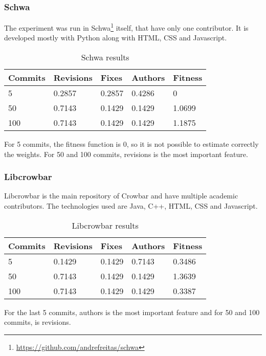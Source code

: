 \subsubsection{Schwa}
The experiment was run in Schwa\footnote{\url{https://github.com/andrefreitas/schwa}} itself, that have only one contributor. It is developed mostly with Python along with HTML, CSS and Javascript.

\begin{table}[H]
    \centering
    \caption{Schwa results}
    \label{table:learning_schwa}
    \begin{tabular}{|l|l|l|l|l|}
        \hline
        Commits & Revisions & Fixes & Authors & Fitness \\ \hline
        5 & 0.2857 & 0.2857 & 0.4286 & 0 \\ \hline
        50 & 0.7143 & 0.1429 & 0.1429 & 1.0699 \\ \hline
        100 & 0.7143 & 0.1429 & 0.1429 & 1.1875 \\ \hline
    \end{tabular}
\end{table}

For 5 commits, the fitness function is 0, so it is not possible to estimate correctly the weights. For 50 and 100 commits, revisions is the most important feature.

\subsubsection{Libcrowbar}
Libcrowbar is the main repository of Crowbar and have multiple academic contributors. The technologies used are Java, C++, HTML, CSS and Javascript.

\begin{table}[H]
    \centering
    \caption{Libcrowbar results}
    \label{table:learning_libcrowbar}
    \begin{tabular}{|l|l|l|l|l|}
        \hline
        Commits & Revisions & Fixes & Authors & Fitness \\ \hline
        5 & 0.1429 & 0.1429 & 0.7143 & 0.3486 \\ \hline
        50 & 0.7143 & 0.1429 & 0.1429 & 1.3639 \\ \hline
        100 & 0.7143 & 0.1429 & 0.1429 & 0.3387 \\ \hline
    \end{tabular}
\end{table}
For the last 5 commits, authors is the most important feature and for 50 and 100 commits, is revisions.

